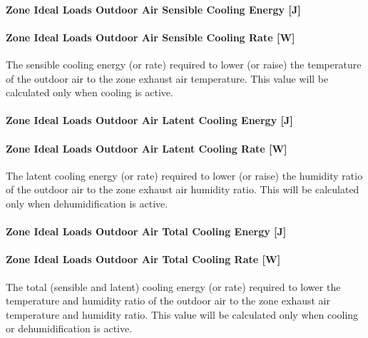 \paragraph{Zone Ideal Loads Outdoor Air Sensible Cooling Energy {[}J{]}}\label{zone-ideal-loads-outdoor-air-sensible-cooling-energy-j}

\paragraph{Zone Ideal Loads Outdoor Air Sensible Cooling Rate {[}W{]}}\label{zone-ideal-loads-outdoor-air-sensible-cooling-rate-w}

The sensible cooling energy (or rate) required to lower (or raise) the temperature of the outdoor air to the zone exhaust air temperature. This value will be calculated only when cooling is active.

\paragraph{Zone Ideal Loads Outdoor Air Latent Cooling Energy {[}J{]}}\label{zone-ideal-loads-outdoor-air-latent-cooling-energy-j}

\paragraph{Zone Ideal Loads Outdoor Air Latent Cooling Rate {[}W{]}}\label{zone-ideal-loads-outdoor-air-latent-cooling-rate-w}

The latent cooling energy (or rate) required to lower (or raise) the humidity ratio of the outdoor air to the zone exhaust air humidity ratio. This will be calculated only when dehumidification is active.

\paragraph{Zone Ideal Loads Outdoor Air Total Cooling Energy {[}J{]}}\label{zone-ideal-loads-outdoor-air-total-cooling-energy-j}

\paragraph{Zone Ideal Loads Outdoor Air Total Cooling Rate {[}W{]}}\label{zone-ideal-loads-outdoor-air-total-cooling-rate-w}

The total (sensible and latent) cooling energy (or rate) required to lower the temperature and humidity ratio of the outdoor air to the zone exhaust air temperature and humidity ratio. This value will be calculated only when cooling or dehumidification is active.

